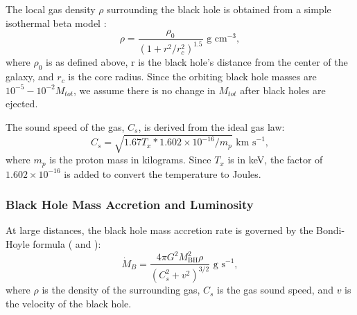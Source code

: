 \documentclass[fleqn,usenatbib,useAMS]{mnras}
\begin{document}
The local gas density ${\rho}$ surrounding the black hole is obtained from a simple isothermal beta model \citep{1962AJ.....67..471K, 1976A&A....49..137C, 1978A&A....70..677C}:
\begin{equation} \label{beta_model}
    \rho = \frac{\rho_0}{(1+r^2/r_c^2)^{1.5}} \text{  g cm}^{-3},
\end{equation}
where $\rho_0$ is as defined above, r is the black hole's distance from the center of the galaxy, and $r_c$ is the core radius.  Since the orbiting black hole masses are $10^{-5}-10^{-2}M_{tot}$, we assume there is no change in $M_{tot}$ after black holes are ejected.

The sound speed of the gas, $C_s$, is derived from the ideal gas law:
\begin{equation}\label{gas_sound_speed}
    C_s = \sqrt{1.67T_x*1.602\times10^{-16}/m_p} \text{  km s}^{-1},
\end{equation}
where $m_p$ is the proton mass in kilograms.  Since $T_x$ is in keV, the factor of $1.602\times10^{-16}$ is added to convert the temperature to Joules.

\subsubsection{Black Hole Mass Accretion and Luminosity}
At large distances, the black hole mass accretion rate is governed by the Bondi-Hoyle formula (\citealt{1944MNRAS.104..273B} and \citealt{1952MNRAS.112..195B}):
\begin{equation}\label{net_accretion}
    \dot{M}_{B} = \frac{4{\pi}G^2M_\mathrm{BH}^2\rho}{(C_s^2+v^2)^{3/2}} \text{  g}\text{ s}^{-1},
\end{equation}
where $\rho$ is the density of the surrounding gas, $C_s$ is the gas sound speed, and $v$ is the velocity of the black hole.
\end{document}
